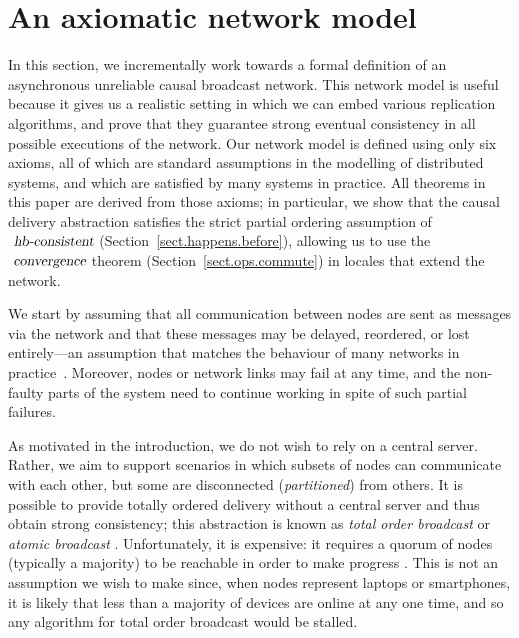 \section{An axiomatic network model}
\label{sect.network}

In this section, we incrementally work towards a formal definition of an asynchronous unreliable causal broadcast network.
This network model is useful because it gives us a realistic setting in which we can embed various replication algorithms, and prove that they guarantee strong eventual consistency in all possible executions of the network.
Our network model is defined using only six axioms, all of which are standard assumptions in the modelling of distributed systems, and which are satisfied by many systems in practice.
All theorems in this paper are derived from those axioms; in particular, we show that the causal delivery abstraction satisfies the strict partial ordering assumption of $\isa{hb-consistent}$ (Section~\ref{sect.happens.before}), allowing us to use the $\isa{convergence}$ theorem (Section~\ref{sect.ops.commute}) in locales that extend the network.

We start by assuming that all communication between nodes are sent as messages via the network and that these messages may be delayed, reordered, or lost entirely---an assumption that matches the behaviour of many networks in practice~\cite{Bailis:2014jx}.
Moreover, nodes or network links may fail at any time, and the non-faulty parts of the system need
to continue working in spite of such partial failures.

As motivated in the introduction, we do not wish to rely on a central server.
Rather, we aim to support scenarios in which subsets of
nodes can communicate with each other, but some are disconnected (\emph{partitioned}) from others.
It is possible to provide totally ordered delivery without a central server and thus obtain strong consistency; this abstraction is known as \emph{total order broadcast} or \emph{atomic broadcast} \cite{Cachin:2011wt,Defago:2004ji}. 
Unfortunately, it is expensive: it requires a quorum of nodes (typically a majority) to be reachable in order to make progress \cite{Chandra:1996cp}.
This is not an assumption we wish to make since, when nodes represent laptops or smartphones, it is likely that less than a majority of devices are online at any one time, and so any algorithm for total order broadcast would be stalled.

